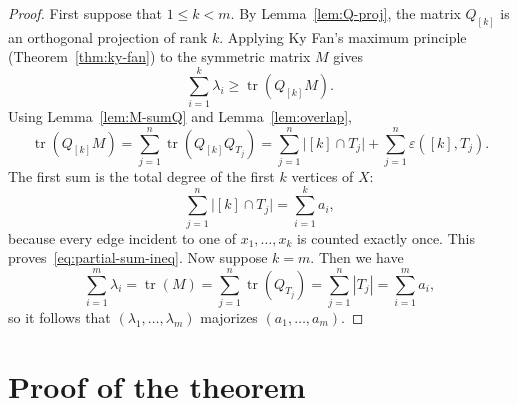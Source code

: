 \documentclass[twoside, reqno]{amsart}
\theoremstyle{definition}
\theoremstyle{remark}
\newcommand{\epsov}{\varepsilon}
\begin{document}
\begin{proof}
First suppose that $1\le k<m$. By Lemma~\ref{lem:Q-proj}, the matrix 
$Q_{[k]}$ is an orthogonal projection of rank $k$. Applying Ky Fan's 
maximum principle (Theorem~\ref{thm:ky-fan}) to the symmetric matrix $M$ gives
\[
\sum_{i=1}^k \lambda_i\ge \operatorname{tr}(Q_{[k]}M).
\]
Using Lemma~\ref{lem:M-sumQ} and Lemma~\ref{lem:overlap},
\[
\operatorname{tr}(Q_{[k]}M)
=\sum_{j=1}^n \operatorname{tr}(Q_{[k]}Q_{T_j})
=\sum_{j=1}^n \bigl|[k]\cap T_j\bigr|
 +\sum_{j=1}^n \epsov([k],T_j).
\]
The first sum is the total degree of the first $k$ vertices of $X$:
\[
\sum_{j=1}^n \bigl|[k]\cap T_j\bigr|=\sum_{i=1}^k a_i,
\]
because every edge incident to one of $x_1,\dots,x_k$ is counted exactly once. 
This proves~\eqref{eq:partial-sum-ineq}.
Now suppose $k=m$. Then we have
\[
\sum_{i=1}^m \lambda_i
=\operatorname{tr}(M)
=\sum_{j=1}^n \operatorname{tr}(Q_{T_j})
=\sum_{j=1}^n |T_j|
=\sum_{i=1}^m a_i,
\]
so it follows that $(\lambda_1,\dots,\lambda_m)$ majorizes $(a_1,\dots,a_m)$.
\end{proof}

\section{Proof of the theorem}
\end{document}
